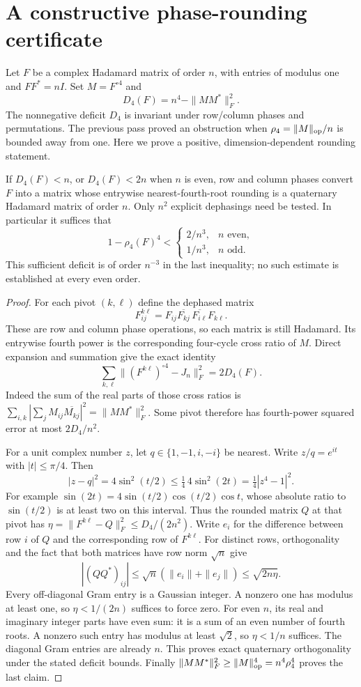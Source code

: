 \section{A constructive phase-rounding certificate}
Let $F$ be a complex Hadamard matrix of order $n$, with entries of
modulus one and $FF^*=nI$. Set $M=F^{\circ4}$ and
\[
 D_4(F)=n^4-\|MM^*\|_F^2.
\]
The nonnegative deficit $D_4$ is invariant under row/column phases
and permutations. The previous pass proved an obstruction when
$\rho_4=\|M\|_{\rm op}/n$ is bounded away from one. Here we prove a
positive, dimension-dependent rounding statement.

\begin{theorem}
\label{thm:phase-rounding}
If $D_4(F)<n$, or $D_4(F)<2n$ when $n$ is even,
row and column phases convert $F$ into
a matrix whose entrywise nearest-fourth-root rounding is a
quaternary Hadamard matrix of order $n$.
Only $n^2$ explicit dephasings need be tested.
In particular it suffices that
\[
 1-\rho_4(F)^4<
 \begin{cases}2/n^3,& n\text{ even},\\1/n^3,&n\text{ odd}.\end{cases}
\]
This sufficient deficit is of order $n^{-3}$ in the last inequality;
no such estimate is established at every even order.
\end{theorem}
\begin{proof}
For each pivot $(k,\ell)$ define the dephased matrix
\[
 F^{k\ell}_{ij}
 =F_{ij}\overline{F_{kj}}\,
       \overline{F_{i\ell}}F_{k\ell}.
\]
These are row and column phase operations, so each matrix is still
Hadamard. Its entrywise fourth power is the corresponding four-cycle
cross ratio of $M$. Direct expansion and summation give the exact identity
\[
 \sum_{k,\ell}\|(F^{k\ell})^{\circ4}-J_n\|_F^2=2D_4(F).
\]
Indeed the sum of the real parts of those cross ratios is
$\sum_{i,k}|\sum_j M_{ij}\overline{M_{kj}}|^2=\|MM^*\|_F^2$.
Some pivot therefore has fourth-power squared error at most
$2D_4/n^2$.

For a unit complex number $z$, let $q\in\{1,-1,i,-i\}$ be nearest.
Write $z/q=e^{it}$ with $|t|\le\pi/4$. Then
\[
 |z-q|^2=4\sin^2(t/2)\le
 \tfrac14\,4\sin^2(2t)=\tfrac14|z^4-1|^2.
\]
For example $\sin(2t)=4\sin(t/2)\cos(t/2)\cos t$, whose absolute
ratio to $\sin(t/2)$ is at least two on this interval.
Thus the rounded matrix $Q$ at that pivot has
$\eta=\|F^{k\ell}-Q\|_F^2\le D_4/(2n^2)$.
Write $e_i$ for the difference between row $i$ of $Q$ and the
corresponding row of $F^{k\ell}$. For distinct rows, orthogonality
and the fact that both matrices have row norm $\sqrt n$ give
\[
 |(QQ^*)_{ij}|
 \le\sqrt n(\|e_i\|+\|e_j\|)
 \le\sqrt{2n\eta}.
\]
Every off-diagonal Gram entry is a Gaussian integer. A nonzero one
has modulus at least one, so $\eta<1/(2n)$ suffices to force zero.
For even $n$, its real and imaginary integer parts have even sum:
it is a sum of an even number of fourth roots. A nonzero such entry
has modulus at least $\sqrt2$, so $\eta<1/n$ suffices.
The diagonal Gram entries are already $n$. This proves exact
quaternary orthogonality under the stated deficit bounds. Finally
$\|MM^*\|_F^2\ge\|M\|_{\rm op}^4=n^4\rho_4^4$ proves the last claim.
\end{proof}

